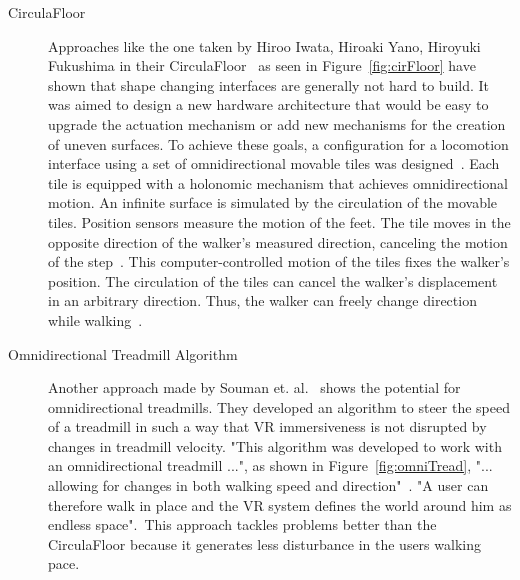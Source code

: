 \begin{description}
	\item[CirculaFloor] Approaches like the one taken by Hiroo Iwata, Hiroaki Yano, Hiroyuki Fukushima in their CirculaFloor~\cite{Iwata:2005:CLI:1078037.1079777} as seen in Figure~\ref{fig:cirFloor} have shown that shape changing interfaces are generally not hard to build. It was aimed to design a new hardware architecture that would be easy to upgrade the actuation mechanism or add new mechanisms for the creation of uneven surfaces. To achieve these goals, a configuration for a locomotion interface using a set of omnidirectional	movable tiles was designed~\cite{Iwata:2005:CLI:1078037.1079777}. \newline Each tile is equipped with a holonomic mechanism that achieves omnidirectional motion. An infinite surface is simulated by the circulation of the movable tiles. Position sensors measure the motion of the feet. The tile moves in the opposite direction of the walker’s measured direction, canceling the motion of the step~\cite{Iwata:2005:CLI:1078037.1079777}. This computer-controlled motion of the tiles fixes the walker’s position. The circulation of the tiles can cancel the walker’s displacement in an arbitrary direction. Thus, the walker can freely change direction while walking~\cite{Iwata:2005:CLI:1078037.1079777}. 
	
	\item[Omnidirectional Treadmill Algorithm]Another approach made by Souman et. al.~\cite{Souman:2010:MVW:1670671.1670675} shows the potential for omnidirectional treadmills. They developed an algorithm to steer the speed of a treadmill in such a way that VR immersiveness is not disrupted by changes in treadmill velocity. "This algorithm was developed to work with an omnidirectional treadmill ...", as shown in Figure~\ref{fig:omniTread}, "... allowing for changes in both walking speed and direction"~\cite{Souman:2010:MVW:1670671.1670675}. "A user can therefore walk in place and the VR system defines the world around him as endless space".~\cite{Souman:2010:MVW:1670671.1670675}\newline This approach tackles problems better than the CirculaFloor because it generates less disturbance in the users walking pace.
	

\end{description}
